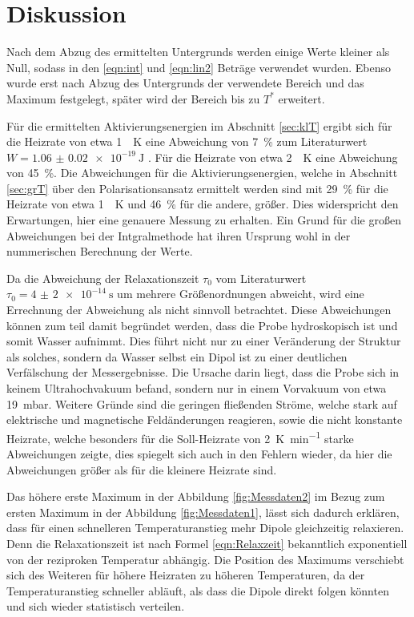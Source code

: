 \section{Diskussion}
\label{sec:Diskussion}
Nach dem Abzug des ermittelten Untergrunds werden einige Werte kleiner als Null, sodass in den \eqref{eqn:int} und \eqref{eqn:lin2} Beträge
verwendet wurden. Ebenso wurde erst nach Abzug des Untergrunds der verwendete Bereich und das Maximum festgelegt, später wird der Bereich bis zu
$T^*$ erweitert.

Für die ermittelten Aktivierungsenergien im Abschnitt \ref{sec:klT} ergibt sich für die Heizrate von etwa \SI{1}{\per\kelvin} eine 
Abweichung von \SI{7}{\percent} zum Literaturwert $W = \SI{1.06(2)e-19}{\joule}$ \cite{quelle}.
Für die Heizrate von  etwa \SI{2}{\per\kelvin} eine Abweichung von \SI{45}{\percent}. 
Die Abweichungen für die Aktivierungsenergien, welche in Abschnitt \ref{sec:grT} über den Polarisationsansatz ermittelt werden sind mit
\SI{29}{\percent} für die Heizrate von etwa \SI{1}{\per\kelvin} und \SI{46}{\percent} für die andere, größer. Dies 
widerspricht den Erwartungen, hier eine genauere Messung zu erhalten. Ein Grund für die großen Abweichungen
bei der Intgralmethode hat ihren Ursprung wohl in der nummerischen Berechnung der Werte.

Da die Abweichung der Relaxationszeit $\tau_0$ vom Literaturwert $\tau_0 = \SI{4(2)e-14}{\second}$ um mehrere Größenordnungen
abweicht, wird eine Errechnung der Abweichung als nicht sinnvoll betrachtet.
Diese Abweichungen können zum teil damit begründet werden, dass die Probe hydroskopisch ist 
und somit Wasser aufnimmt. Dies führt nicht nur zu einer Veränderung der Struktur als solches, sondern da Wasser selbst ein 
Dipol ist zu einer deutlichen Verfälschung der Messergebnisse. Die Ursache darin liegt, dass die Probe sich in keinem 
Ultrahochvakuum befand, sondern nur in einem Vorvakuum von etwa \SI{19}{\milli\bar}. 
Weitere Gründe sind die geringen fließenden Ströme, welche stark auf elektrische und magnetische Feldänderungen reagieren, sowie
die nicht konstante Heizrate, welche besonders für die Soll-Heizrate von \SI{2}{\kelvin\per\minute} starke Abweichungen zeigte, dies 
spiegelt sich auch in den Fehlern wieder, da hier die Abweichungen größer als für die kleinere Heizrate sind.


Das höhere erste Maximum in der Abbildung \ref{fig:Messdaten2} im Bezug zum ersten Maximum in der Abbildung \ref{fig:Messdaten1}, lässt
sich dadurch erklären, dass für einen schnelleren Temperaturanstieg mehr Dipole gleichzeitig relaxieren. Denn die Relaxationszeit
ist nach Formel \eqref{eqn:Relaxzeit} bekanntlich exponentiell von der reziproken Temperatur abhängig.
Die Position des Maximums verschiebt sich des Weiteren für höhere Heizraten zu höheren Temperaturen, da der Temperaturanstieg
schneller abläuft, als dass die Dipole direkt folgen könnten und sich wieder statistisch verteilen.

